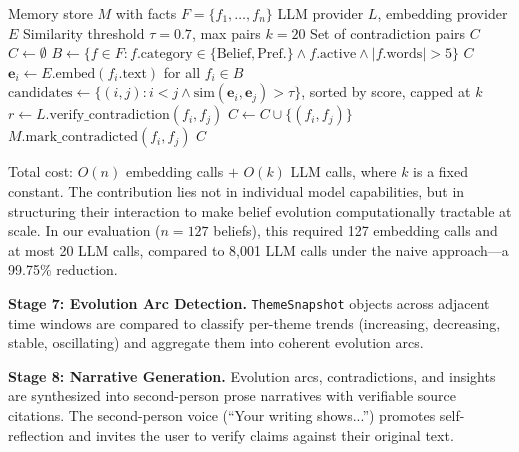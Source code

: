\documentclass[pdflatex,sn-mathphys-num]{sn-jnl}
\begin{document}
\begin{algorithm}[t]
\caption{Contradiction Detection}\label{alg:contradiction}
\begin{algorithmic}[1]
\Require Memory store $M$ with facts $F = \{f_1, \ldots, f_n\}$
\Require LLM provider $L$, embedding provider $E$
\Require Similarity threshold $\tau = 0.7$, max pairs $k = 20$
\Ensure Set of contradiction pairs $C$
\State $C \leftarrow \emptyset$
\State $B \leftarrow \{f \in F : f.\text{category} \in \{\text{Belief}, \text{Pref.}\} \wedge f.\text{active} \wedge |f.\text{words}| > 5\}$
    \State \Return $C$
\EndIf
\State $\mathbf{e}_i \leftarrow E.\text{embed}(f_i.\text{text})$ for all $f_i \in B$ 
\State $\text{candidates} \leftarrow \{(i,j) : i < j \wedge \text{sim}(\mathbf{e}_i, \mathbf{e}_j) > \tau\}$, sorted by score, capped at $k$
    \State $r \leftarrow L.\text{verify\_contradiction}(f_i, f_j)$ 
        \State $C \leftarrow C \cup \{(f_i, f_j)\}$
        \State $M.\text{mark\_contradicted}(f_i, f_j)$
    \EndIf
\EndFor
\State \Return $C$
\end{algorithmic}
\end{algorithm}

Total cost: $O(n)$ embedding calls $+$ $O(k)$ LLM calls, where $k$ is a fixed constant. The contribution lies not in individual model capabilities, but in structuring their interaction to make belief evolution computationally tractable at scale. In our evaluation ($n{=}127$ beliefs), this required 127 embedding calls and at most 20 LLM calls, compared to 8,001 LLM calls under the naive approach---a 99.75\% reduction.

\textbf{Stage 7: Evolution Arc Detection.} \texttt{ThemeSnapshot} objects across adjacent time windows are compared to classify per-theme trends (increasing, decreasing, stable, oscillating) and aggregate them into coherent evolution arcs.

\textbf{Stage 8: Narrative Generation.} Evolution arcs, contradictions, and insights are synthesized into second-person prose narratives with verifiable source citations. The second-person voice (``Your writing shows...'') promotes self-reflection \cite{wilson2011selfhelp} and invites the user to verify claims against their original text.

\end{document}
